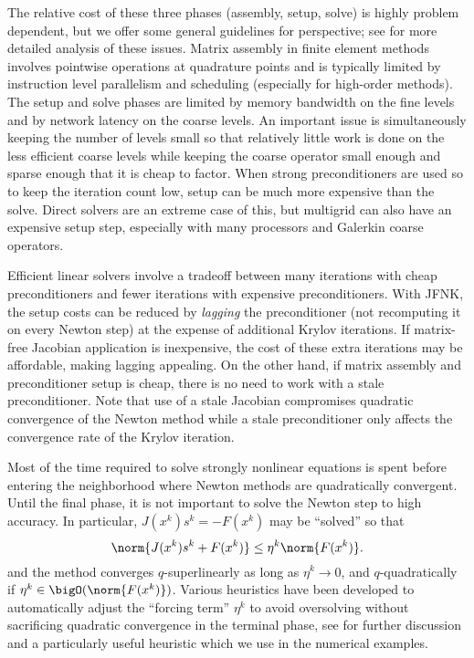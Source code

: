 The relative cost of these three phases (assembly, setup, solve) is highly problem dependent, but we offer some general
guidelines for perspective; see \citet{gropp2000pmt,knoll2004jfn,knoll1998eni} for more detailed analysis of these
issues.  Matrix assembly in finite element methods involves pointwise operations at quadrature points and is typically
limited by instruction level parallelism and scheduling (especially for high-order methods).  The setup and solve phases
are limited by memory bandwidth on the fine levels and by network latency on the coarse levels.  An important issue is
simultaneously keeping the number of levels small so that relatively little work is done on the less efficient coarse
levels while keeping the coarse operator small enough and sparse enough that it is cheap to factor.  When strong
preconditioners are used so to keep the iteration count low, setup can be much more expensive than the solve.  Direct
solvers are an extreme case of this, but multigrid can also have an expensive setup step, especially with many
processors and Galerkin coarse operators.

Efficient linear solvers involve a tradeoff between many iterations with cheap preconditioners and fewer iterations with
expensive preconditioners.  With JFNK, the setup costs can be reduced by \emph{lagging} the preconditioner (not
recomputing it on every Newton step) at the expense of additional Krylov iterations.  If matrix-free Jacobian
application is inexpensive, the cost of these extra iterations may be affordable, making lagging appealing.  On the
other hand, if matrix assembly and preconditioner setup is cheap, there is no need to work with a stale preconditioner.
Note that use of a stale Jacobian compromises quadratic convergence of the Newton method while a stale preconditioner
only affects the convergence rate of the Krylov iteration.

Most of the time required to solve strongly nonlinear equations is spent before entering the neighborhood where Newton
methods are quadratically convergent.  Until the final phase, it is not important to solve the Newton step to high
accuracy.  In particular, $J(x^{k}) s^k = - F(x^k)$ may be ``solved'' so that
\begin{equation*}
  \norm{J(x^{k}) s^k + F(x^k)} \le \eta^k \norm{F(x^k)} .
\end{equation*}
and the method converges $q$-superlinearly as long as $\eta^k \to 0$, and $q$-quadratically if $\eta^k \in
\bigO(\norm{F(x^k)})$.  Various heuristics have been developed to automatically adjust the ``forcing term'' $\eta^k$ to
avoid oversolving without sacrificing quadratic convergence in the terminal phase, see \citet{eisenstat1996cft} for
further discussion and a particularly useful heuristic which we use in the numerical examples.

